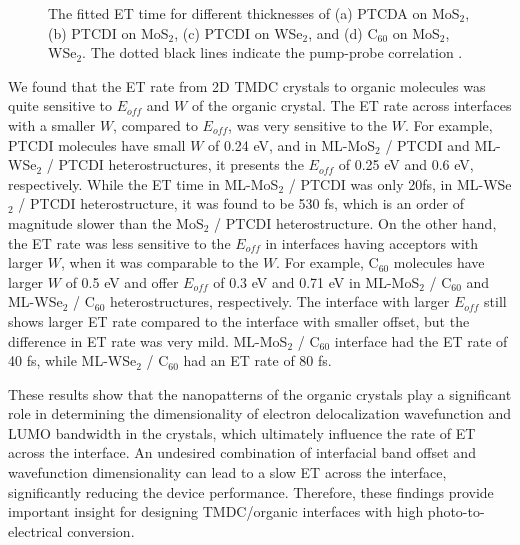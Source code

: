 \documentclass[12pt]{article}
\begin{document}
\begin{figure}[H]
\caption{The fitted ET time for different thicknesses of (a) PTCDA on MoS$_2$, (b) PTCDI on MoS$_2$, (c) PTCDI on WSe$_2$, and (d) C$_{60}$ on MoS$_2$, WSe$_2$. The dotted black lines indicate the pump-probe correlation \cite{rijal2020collective}.}\label{fig:CT rate fitting}
\end{figure}

We found that the ET rate from 2D TMDC crystals to organic molecules was quite sensitive to $E_{off}$ and $W$ of the organic crystal. The ET rate across interfaces with a smaller $W$, compared to $E_{off}$, was very sensitive to the $W$. For example, PTCDI molecules have small $W$ of  0.24 eV, and in ML-MoS$_2$ / PTCDI and ML-WSe$_2$ / PTCDI heterostructures, it presents the $E_{off}$ of 0.25 eV and 0.6 eV, respectively. While the ET time in ML-MoS$_2$ / PTCDI was only 20fs, in ML-WSe$_2$ / PTCDI heterostructure, it was found to be 530 fs, which is an order of magnitude slower than the MoS$_2$ / PTCDI heterostructure. On the other hand, the ET rate was less sensitive to the $E_{off}$ in interfaces having acceptors with larger $W$, when it was comparable to the $W$. For example, C$_{60}$ molecules have larger $W$ of 0.5 eV and offer $E_{off}$ of 0.3 eV and 0.71 eV in ML-MoS$_2$ / C$_{60}$ and ML-WSe$_2$ / C$_{60}$ heterostructures, respectively. The interface with larger $E_{off}$ still shows larger ET rate compared to the interface with smaller offset, but the difference in ET rate was very mild. ML-MoS$_2$ / C$_{60}$ interface had the ET rate of 40 fs, while ML-WSe$_2$ / C$_{60}$ had an ET rate of 80 fs. 
\vspace{7pt}

These results show that the nanopatterns of the organic crystals play a significant role in determining the dimensionality of electron delocalization wavefunction and LUMO bandwidth in the crystals, which ultimately influence the rate of ET across the interface. An undesired combination of interfacial band offset and wavefunction dimensionality can lead to a slow ET across the interface, significantly reducing the device performance. Therefore, these findings provide important insight for designing TMDC/organic interfaces with high photo-to-electrical conversion.
\end{document}
